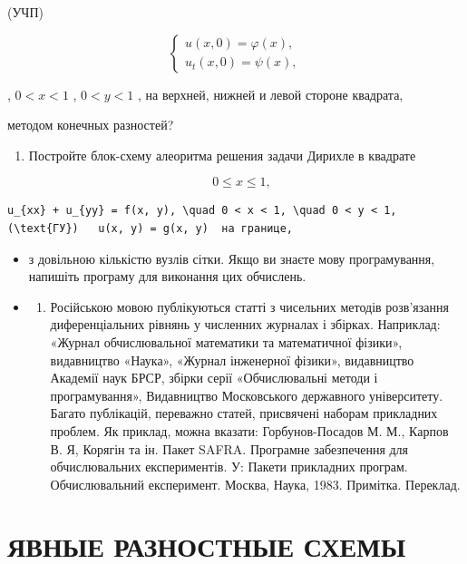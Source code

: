 \documentclass[
  ukrainian,
]{article}
\providecommand{\tightlist}{%
  \setlength{\itemsep}{0pt}\setlength{\parskip}{0pt}}
\begin{document}
(УЧП)

\[
\begin{cases} u(x, 0) = \varphi(x), \\ u_t(x, 0) = \psi(x), \end{cases}
\]

, \(0 < x < 1\) , \(0 < y < 1\) , на верхней, нижней и левой стороне
квадрата,

методом конечных разностей?

\begin{enumerate}
\def\labelenumi{\arabic{enumi}.}
\setcounter{enumi}{5}
\tightlist
\item
  Постройте блок-схему алеоритма решения задачи Дирихле в квадрате
\end{enumerate}

\[
\quad 0 \leqslant x \leqslant 1,
\]

\begin{verbatim}
u_{xx} + u_{yy} = f(x, y), \quad 0 < x < 1, \quad 0 < y < 1,   (\text{ГУ})   u(x, y) = g(x, y)  на границе,
\end{verbatim}

\begin{itemize}
\item
  з довільною кількістю вузлів сітки. Якщо ви знаєте мову програмування,
  напишіть програму для виконання цих обчислень.
\item
  \begin{enumerate}
  \def\labelenumi{\arabic{enumi})}
  \tightlist
  \item
    Російською мовою публікуються статті з чисельних методів розв'язання
    диференціальних рівнянь у численних журналах і збірках. Наприклад:
    «Журнал обчислювальної математики та математичної фізики»,
    видавництво «Наука», «Журнал інженерної фізики», видавництво
    Академії наук БРСР, збірки серії «Обчислювальні методи і
    програмування», Видавництво Московського державного університету.
    Багато публікацій, переважно статей, присвячені наборам прикладних
    проблем. Як приклад, можна вказати: Горбунов-Посадов М. М., Карпов
    В. Я, Корягін та ін. Пакет SAFRA. Програмне забезпечення для
    обчислювальних експериментів. У: Пакети прикладних програм.
    Обчислювальний експеримент. Москва, Наука, 1983. Примітка. Переклад.
  \end{enumerate}
\end{itemize}

\section{ЯВНЫЕ РАЗНОСТНЫЕ
СХЕМЫ}\label{ux44fux432ux43dux44bux435-ux440ux430ux437ux43dux43eux441ux442ux43dux44bux435-ux441ux445ux435ux43cux44b}
\end{document}
